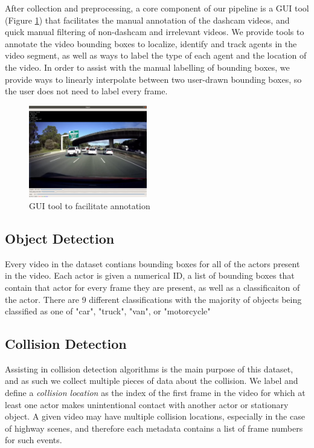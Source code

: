 \documentclass[letterpaper, 10 pt, conference]{ieeeconf}
\begin{document}
After collection and preprocessing, a core component of our pipeline is a GUI tool (Figure \ref{fig:example_gui_tool-png}) that facilitates the manual annotation of the dashcam videos, and quick manual filtering of non-dashcam and irrelevant videos. We provide tools to annotate the video bounding boxes to localize, identify and track agents in the video segment, as well as ways to label the type of each agent and the location of the video. In order to assist with the manual labelling of bounding boxes, we provide ways to linearly interpolate between two user-drawn bounding boxes, so the user does not need to label every frame.

\begin{figure}[htbp]
  \centering
  \includegraphics[width=0.46\textwidth]{example_gui_tool.png}
  \caption{GUI tool to facilitate annotation}
  \label{fig:example_gui_tool-png}
\end{figure}

\subsection{Object Detection}
Every video in the dataset contians bounding boxes for all of the actors present in the video. Each actor is given a numerical ID, a list of bounding boxes that contain that actor for every frame they are present, as well as a classificaiton of the actor. There are 9 different classifications with the majority of objects being classified as one of "car", "truck", "van", or "motorcycle"

\subsection{Collision Detection}
Assisting in collision detection algorithms is the main purpose of this dataset, and as such we collect multiple pieces of data about the collision. We label and define a \textit{collision location} as the index of the first frame in the video for which at least one actor makes unintentional contact with another actor or stationary object. A given video may have multiple collision locations, especially in the case of highway scenes, and therefore each metadata contains a list of frame numbers for such events.
\end{document}
